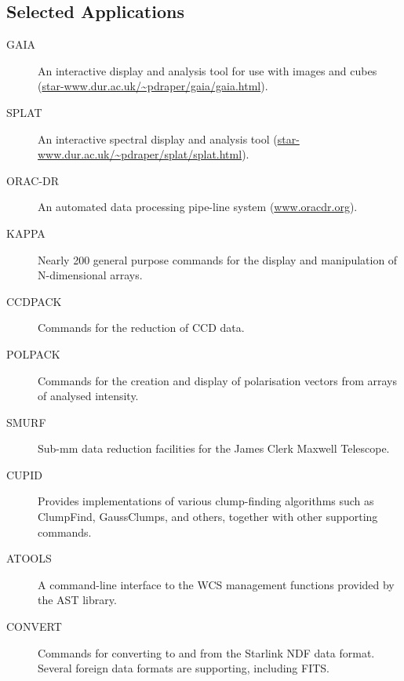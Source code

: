\subsection{Selected Applications}
\begin{description}
\item[GAIA] An interactive display and analysis tool for use with images and cubes (\url{star-www.dur.ac.uk/~pdraper/gaia/gaia.html}).
\item[SPLAT] An interactive spectral display and analysis tool (\url{star-www.dur.ac.uk/~pdraper/splat/splat.html}).
\item[ORAC-DR] An automated data processing pipe-line system
(\url{www.oracdr.org}).
\item[KAPPA] Nearly 200 general purpose commands for the display and manipulation of N-dimensional arrays.
\item[CCDPACK] Commands for the reduction of CCD data.
\item[POLPACK] Commands for the creation and display of polarisation vectors from arrays of analysed intensity.
\item[SMURF] Sub-mm data reduction facilities for the James Clerk Maxwell Telescope.
\item[CUPID] Provides implementations of various clump-finding algorithms such as ClumpFind, GaussClumps, and others, together with other supporting commands.
\item[ATOOLS] A command-line interface to the WCS management functions provided by the AST library.
\item[CONVERT] Commands for converting to and from the Starlink NDF data format. Several foreign data formats are supporting, including FITS.
\end{description}

